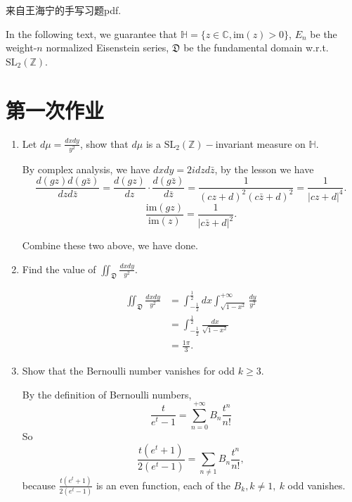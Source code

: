 

来自王海宁的手写习题pdf.

In the following text, we guarantee that $\mathbb{H} = 
\{z \in \mathbb C, \mathrm{im}(z) > 0\}$, $E_n$ be the weight-$n$ normalized Eisenstein series, $\mathfrak{D}$ be the fundamental domain w.r.t. $\mathrm{SL_2}(\mathbb{Z})$.

\section{第一次作业}
\begin{enumerate}[1]
    \item Let $d\mu = \frac{dxdy} {y^2}$, show that $d\mu$ is a $\mathrm{SL_2}(\mathbb{Z})-$invariant measure on $\mathbb{H}$.
    \begin{proofc}[解答]
        By complex analysis, we have $dxdy = 2idzd\bar{z}$, by the lesson we have $$\frac{d(gz)d(g\bar z)}{dz d\bar{z}} = \frac{d(gz)}{dz} \cdot \frac{d(g\bar z)}{d\bar{z}} = \frac{1}{(cz+d)^2 (c\bar z + d)^2} = \frac{1}{|cz+d| ^4}.$$
        $$\frac{\mathrm{im}(gz)}{\mathrm{im}(z)} = \frac{1}{|c\bar z+d|^2}.$$

        Combine these two above, we have done.
    \end{proofc}

    \item Find the value of $\displaystyle \iint_{\mathfrak {D}} \frac{dxdy} {y^2}$.
    \begin{proofc}[解答]
        \begin{align}
            \iint_{\mathfrak {D}} \frac{dxdy} {y^2} & = \int_{-\frac12}^{\frac12} dx \int_{\sqrt{1-x^2}}^{+\infty} \frac{dy}{y^2}\\
            & = \int_{-\frac12}^{\frac12} \frac{dx}{\sqrt{1-x^2}} \\
            & = \frac{1\pi}{3}.
        \end{align}
    \end{proofc}

    \item Show that the Bernoulli number vanishes for odd $k \geq 3$.
    \begin{proofc}[解答]
        By the definition of Bernoulli numbers, $$\frac{t}{e^t-1} = \sum_{n=0}^{+\infty} B_n \frac{t^n}{n!}$$
        So $$\frac{t(e^t+1)}{2(e^t-1)} = \sum_{n\neq 1}B_n \frac{t^n}{n!}, $$
        because $\frac{t(e^t+1)}{2(e^t-1)}$ is an even function, each of the $B_k, k\neq 1, \ k$ odd vanishes.
    \end{proofc}




\end{enumerate}
